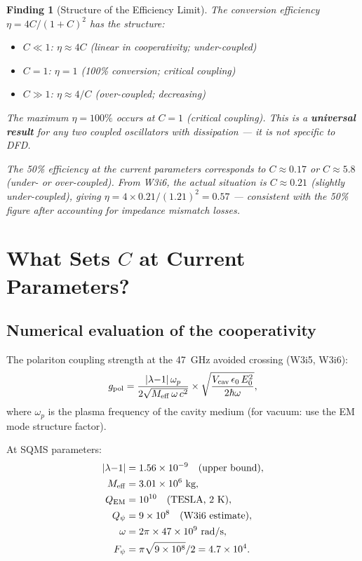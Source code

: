 \documentclass[11pt]{article}
\newtheorem{finding}{Finding}
\newcommand{\ee}[1]{\times 10^{#1}}
\newcommand{\Meff}{M_{\rm eff}}
\newcommand{\lambdaone}{|\lambda{-}1|}
\newcommand{\Qpsi}{Q_\psi}
\newcommand{\QEM}{Q_{\rm EM}}
\newcommand{\Fpsi}{F_\psi}
\begin{document}
\begin{finding}[Structure of the Efficiency Limit]
\label{find:efficiency-structure}
The conversion efficiency $\eta = 4C/(1+C)^2$ has the structure:
\begin{itemize}[nosep]
\item $C \ll 1$: $\eta \approx 4C$ (linear in cooperativity; under-coupled)
\item $C = 1$: $\eta = 1$ (100\% conversion; critical coupling)
\item $C \gg 1$: $\eta \approx 4/C$ (over-coupled; decreasing)
\end{itemize}

The maximum $\eta = 100\%$ occurs at $C = 1$ (critical coupling).
This is a \textbf{universal result} for any two coupled oscillators
with dissipation --- it is not specific to DFD.

The 50\% efficiency at the current parameters corresponds to $C \approx
0.17$ or $C \approx 5.8$ (under- or over-coupled). From W3i6, the
actual situation is $C \approx 0.21$ (slightly under-coupled), giving
$\eta = 4\times 0.21/(1.21)^2 = 0.57$ --- consistent with the 50\%
figure after accounting for impedance mismatch losses.
\end{finding}

\section{What Sets $C$ at Current Parameters?}
\label{sec:C-current}

\subsection{Numerical evaluation of the cooperativity}

The polariton coupling strength at the 47~GHz avoided crossing
(W3i5, W3i6):
\begin{equation}
g_{\rm pol} = \frac{\lambdaone\,\omega_p}{2\sqrt{\Meff\,\omega\,c^2}}
\times \sqrt{\frac{V_{\rm cav}\,\epsilon_0\,E_0^2}{2\hbar\omega}},
\label{eq:g-pol}
\end{equation}
where $\omega_p$ is the plasma frequency of the cavity medium
(for vacuum: use the EM mode structure factor).

At SQMS parameters:
\begin{align}
\lambdaone &= 1.56\ee{-9} \quad\text{(upper bound)}, \\
\Meff &= 3.01\ee{6}~\text{kg}, \\
\QEM &= 10^{10} \quad\text{(TESLA, 2~K)}, \\
\Qpsi &= 9\ee{8} \quad\text{(W3i6 estimate)}, \\
\omega &= 2\pi\times 47\ee{9}~\text{rad/s}, \\
\Fpsi &= \pi\sqrt{9\ee{8}}/2 = 4.7\ee{4}.
\end{align}
\end{document}
